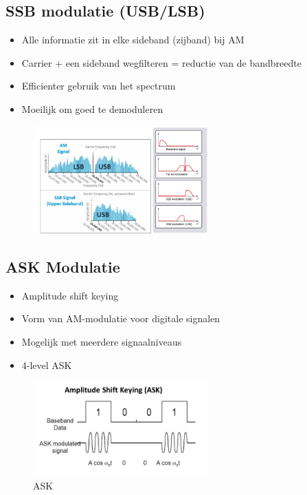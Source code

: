 \documentclass{article}
\begin{document}
\subsection{SSB modulatie (USB/LSB)}
\begin{itemize}
    \item Alle informatie zit in elke sideband (zijband) bij AM
    \item Carrier + een sideband wegfilteren = reductie van de bandbreedte
    \item Efficienter gebruik van het spectrum
    \item Moeilijk om goed te demoduleren
\end{itemize}

\begin{figure}[H]
    \centering
    \includegraphics[width=0.6\textwidth]{Screenshot_20200302_120812.png}
    \caption{}
\end{figure}

\subsection{ASK Modulatie}
\begin{itemize}
    \item Amplitude shift keying
    \item Vorm van AM-modulatie voor digitale signalen
    \item Mogelijk met meerdere signaalniveaus
    \item 4-level ASK
\end{itemize}

\begin{figure}[H]
    \centering
    \includegraphics[width=0.6\textwidth]{Screenshot_20200302_121007.png}
    \caption{ASK}
\end{figure}
\end{document}
